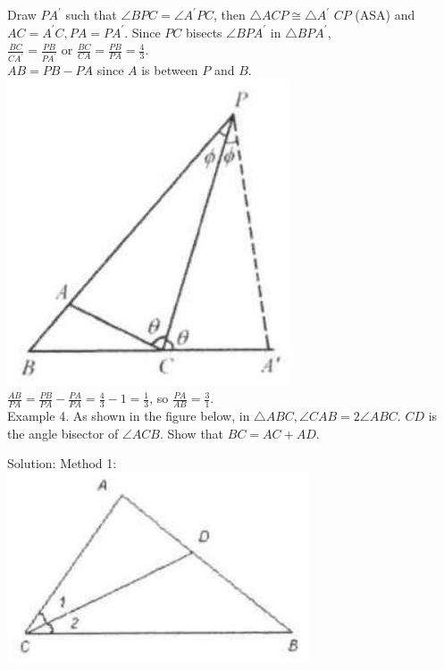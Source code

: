 \documentclass[10pt]{article}
\begin{document}
Draw \(P A^{\prime}\) such that \(\angle B P C=\angle A^{\prime} P C\), then \(\triangle A C P \cong \triangle A^{\prime}\) \(C P\) (ASA) and \(A C=A^{\prime} C, P A=P A^{\prime}\). Since \(P C\) bisects \(\angle B P A^{\prime}\) in \(\triangle B P A^{\prime}\),\\
\(\frac{B C}{C A^{\prime}}=\frac{P B}{P A^{\prime}}\) or \(\frac{B C}{C A}=\frac{P B}{P A}=\frac{4}{3}\).\\
\(A B=P B-P A\) since \(A\) is between \(P\) and \(B\).\\
\includegraphics[max width=\textwidth, center]{2025_04_17_97bc1f7e44d93c271a88g-056(3)}\\
\(\frac{A B}{P A}=\frac{P B}{P A}-\frac{P A}{P A}=\frac{4}{3}-1=\frac{1}{3}\), so \(\frac{P A}{A B}=\frac{3}{1}\).\\
Example 4. As shown in the figure below, in \(\triangle A B C, \angle C A B=2 \angle A B C\). \(C D\) is the angle bisector of \(\angle A C B\). Show that \(B C=A C+A D\).

Solution:
Method 1:\\
\includegraphics[max width=\textwidth, center]{2025_04_17_97bc1f7e44d93c271a88g-056}
\end{document}
